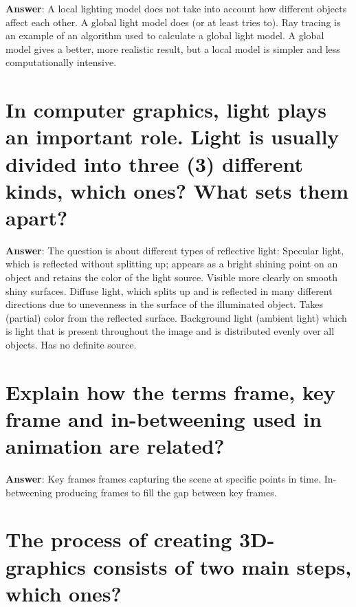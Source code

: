 \documentclass[a4paper,11pt,oneside]{book}
\begin{document}
\begin{sloppypar}
\label{q:305:sa:en:True}

\textbf{Answer}: A local lighting model does not take into account how different objects affect each other. A global light model does (or at least tries to). Ray tracing is an example of an algorithm used to calculate a global light model. A global model gives a better, more realistic result, but a local model is simpler and less computationally intensive.



\section{In computer graphics, light plays an important role. Light is usually divided into three (3) different kinds, which ones? What sets them apart?}

\label{q:306:sa:en:True}

\textbf{Answer}: The question is about different types of reflective light: Specular light, which is reflected without splitting up; appears as a bright shining point on an object and retains the color of the light source. Visible more clearly on smooth shiny surfaces. Diffuse light, which splits up and is reflected in many different directions due to unevenness in the surface of the illuminated object. Takes (partial) color from the reflected surface. Background light (ambient light) which is light that is present throughout the image and is distributed evenly over all objects. Has no definite source.



\section{Explain how the terms frame, key frame and in-betweening used in animation are related?}

\label{q:307:sa:en:True}

\textbf{Answer}: Key frames {\textendash} frames capturing the scene at specific points in time. In-betweening {\textendash} producing frames to fill the gap between key frames.



\section{The process of creating 3D-graphics consists of two main steps, which ones?}

\label{q:308:sa:en:True}


\end{sloppypar}
\end{document}
